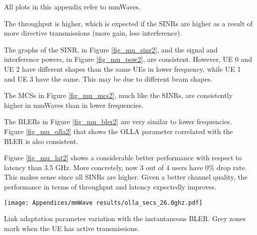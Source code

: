 \label{ap:mmWave_simulation_plots}

All plots in this appendix refer to mmWaves. 

The throughput is higher, which is expected if the SINRs are higher as a result of more directive transmissions (more gain, less interference).


The graphs of the SINR, in Figure \ref{fig_mu_sinr2}, and the signal and interference powers, in Figure \ref{fig_mu_pow2}, are consistent. However, UE 0 and UE 2 have different shapes than the same UEs in lower frequency, while UE 1 and UE 3 have the same. This may be due to different beam shapes. 

The MCSs in Figure \ref{fig_mu_mcs2}, much like the SINRs, are consistently higher in mmWaves than in lower frequencies.

The BLERs in Figure \ref{fig_mu_bler2} are very similar to lower frequencies. Figure \ref{fig_mu_olla2} that shows the OLLA parameter correlated with the BLER is also consistent.

Figure \ref{fig_mu_lat2} shows a considerable better performance with respect to latency than 3.5 GHz. More concretely, now 3 out of 4 users have 0\% drop rate. This makes sense since all SINRs are higher. Given a better channel quality, the performance in terms of throughput and latency expectedly improves.









\begin{center}

    \hfill \texttt{[image: Appendices/mmWave results/olla\_secs\_26.0ghz.pdf]}
    \captionsetup{type=figure} 
    \vspace{-3mm}   
    \caption{Link adaptation parameter variation with the instantaneous \acs{BLER}. Grey zones mark when the UE has active transmissions.}			
    \label{fig_mu_olla2}
    
\end{center}





